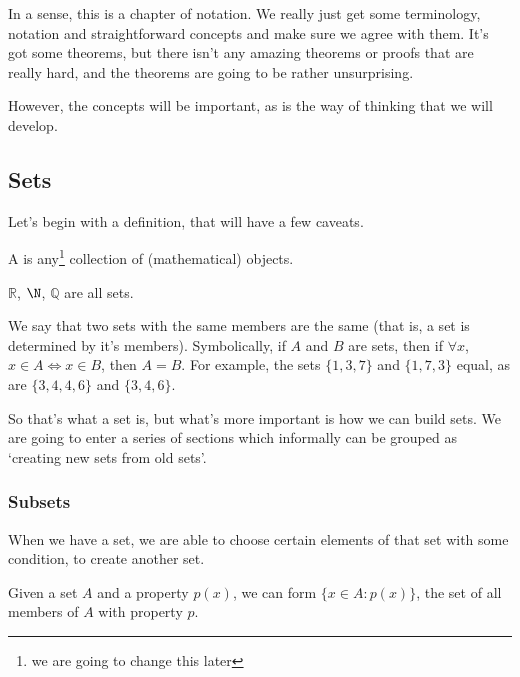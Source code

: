 \documentclass[a4paper]{scrartcl}
\begin{document}
In a sense, this is a chapter of notation. We really just get some terminology, notation and straightforward concepts and make sure we agree with them. It's got some theorems, but there isn't any amazing theorems or proofs that are really hard, and the theorems are going to be rather unsurprising.

However, the concepts will be important, as is the way of thinking that we will develop.

\subsection{Sets}

Let's begin with a definition, that will have a few caveats.

\begin{definition}[Set]
A  is any\footnote{we are going to change this later} collection of (mathematical) objects.
\end{definition}

\begin{example}
	$\mathbb{R}$, $\N$, $\mathbb{Q}$ are all sets.
\end{example}

We say that two sets with the same members are the same (that is, a set is determined by it's members).
Symbolically, if $A$ and $B$ are sets, then if $\forall x$, $x \in A \iff x \in B$, then $A = B$.
 For example, the sets $\{1, 3, 7 \}$ and $\{1, 7, 3\}$ equal, as are $\{3, 4, 4, 6\} $ and $\{3, 4, 6\}$.



So that's what a set is, but what's more important is how we can build sets. We are going to enter a series of sections which informally can be grouped as `creating new sets from old sets'.

\subsubsection{Subsets}

When we have a set, we are able to choose certain elements of that set with some condition, to create another set.


\begin{axiom}
	Given a set $A$ and a property $p(x)$, we can form $\{x \in A : p(x)\}$, the set of all members of $A$ with property $p$.
\end{axiom}
\end{document}
